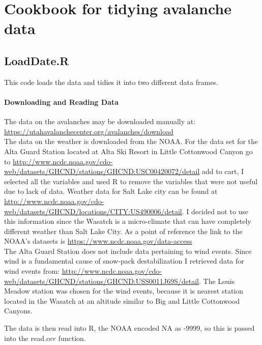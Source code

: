 \documentclass[12pt]{article}
\begin{document}
\section*{Cookbook for tidying avalanche data}
\subsection*{LoadDate.R}
This code loads the data and tidies it into two different data frames.
\paragraph*{Downloading and Reading Data}
The data on the avalanches may be downloaded manually at:\\ \url{https://utahavalanchecenter.org/avalanches/download}\\

The data on the weather is downloaded from the NOAA.  For the data set for the Alta Guard Station located at Alta Ski Resort in Little Cottonwood Canyon go to \url{http://www.ncdc.noaa.gov/cdo-web/datasets/GHCND/stations/GHCND:USC00420072/detail} add to cart, I selected all the variables and used R to remove the variables that were not useful due to lack of data.  Weather data for Salt Lake city can be found at \url{http://www.ncdc.noaa.gov/cdo-web/datasets/GHCND/locations/CITY:US490006/detail}.  I decided not to use this information since the Wasatch is a micro-climate that can have completely different weather than Salt Lake City.  As a point of reference the link to the NOAA's datasets is \url{https://www.ncdc.noaa.gov/data-access}\\

The Alta Guard Station does not include data pertaining to wind events.  Since wind is a fundamental cause of snow-pack destabilization I retrieved data for wind events from: \url{http://www.ncdc.noaa.gov/cdo-web/datasets/GHCND/stations/GHCND:USS0011J69S/detail}.  The Louis Meadow station was chosen for the wind events, because it is nearest station located in the Wasatch at an altitude similar to Big and Little Cottonwood Canyons.

The data is then read into R, the NOAA encoded NA as -9999, so this is passed into the read.csv function.
\end{document}
